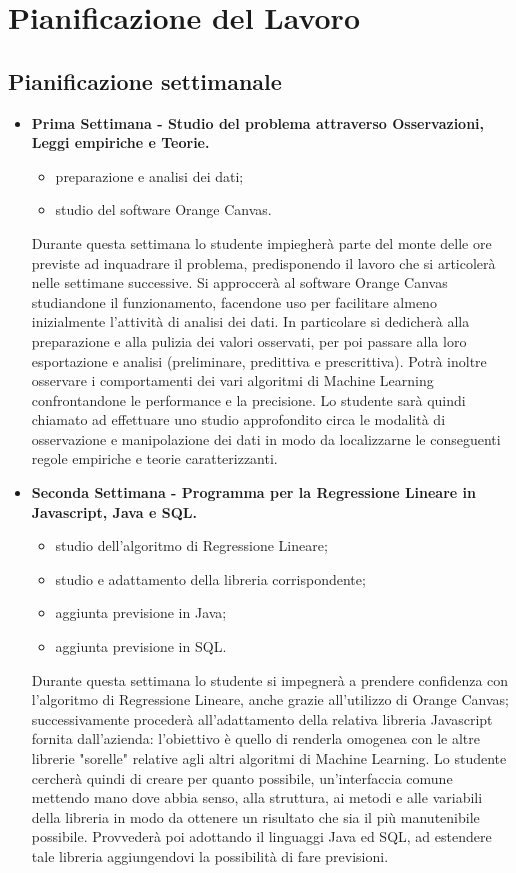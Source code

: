 \section{Pianificazione del Lavoro}
\subsection{Pianificazione settimanale}
\begin{itemize}
\item \textbf{Prima Settimana - Studio del problema attraverso Osservazioni, Leggi empiriche e Teorie.}
	\begin{itemize}
	\item preparazione e analisi dei dati;
	\item studio del software Orange Canvas.
	\end{itemize}
	Durante questa settimana lo studente impiegherà parte del monte delle ore previste ad inquadrare il problema, predisponendo il lavoro che si articolerà  nelle settimane successive. Si approccerà al software Orange Canvas studiandone il funzionamento, facendone uso per facilitare almeno inizialmente l'attività di analisi dei dati. In particolare si dedicherà alla  preparazione e alla pulizia dei valori osservati, per poi passare alla loro esportazione e analisi (preliminare, predittiva e prescrittiva). Potrà inoltre osservare i comportamenti dei vari algoritmi di Machine Learning confrontandone le performance e la precisione. Lo studente sarà quindi chiamato ad effettuare uno studio approfondito circa le modalità di osservazione e manipolazione dei dati in modo da localizzarne le conseguenti regole empiriche e teorie caratterizzanti.

\item \textbf{Seconda Settimana - Programma per la Regressione Lineare in Javascript, Java e SQL.}
	\begin{itemize}
	\item studio dell'algoritmo di Regressione Lineare;
	\item studio e adattamento della libreria corrispondente;
	\item aggiunta previsione in Java;
	\item aggiunta previsione in SQL.
	\end{itemize}
	Durante questa settimana lo studente si impegnerà a prendere confidenza con l'algoritmo di Regressione Lineare, anche grazie all'utilizzo di Orange Canvas; successivamente procederà all'adattamento della relativa libreria Javascript fornita dall'azienda: l'obiettivo è quello di  renderla omogenea con le altre librerie "sorelle" relative agli altri algoritmi di Machine Learning. Lo studente cercherà quindi di creare per quanto possibile, un'interfaccia comune mettendo mano dove abbia senso, alla struttura, ai metodi e alle variabili della libreria in modo da ottenere un risultato che sia il più manutenibile possibile. Provvederà poi adottando il linguaggi Java ed SQL, ad estendere tale libreria aggiungendovi la possibilità di fare previsioni. 


\end{itemize}
